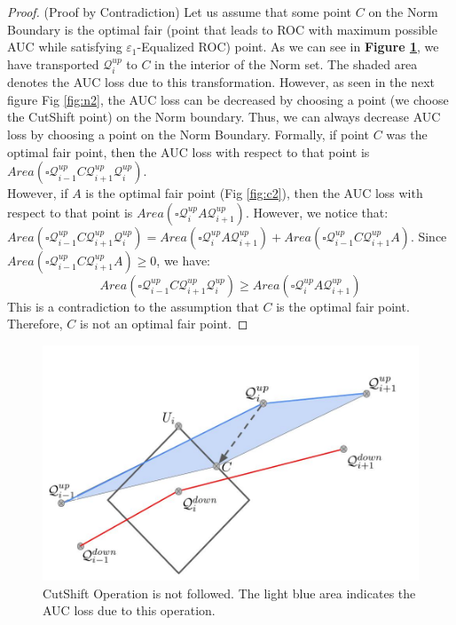 \documentclass{article}
\newcommand{\ourdef}{-Equalized ROC}
\begin{document}
\begin{proof}
(Proof by Contradiction) 
Let us assume that some point $C$ on the Norm Boundary is the optimal fair (point that leads to ROC with maximum possible AUC while satisfying $\varepsilon_1$\ourdef) point. 
As we can see in \textbf{Figure \ref{fig:c1}}, we have transported $\mathcal{Q}_{i}^{up}$ to $C$ in the interior of the Norm set. The shaded area denotes the AUC loss due to this transformation. However, as seen in the next figure Fig \ref{fig:n2}, the AUC loss can be decreased by choosing a point (we choose the CutShift point) on the Norm boundary. Thus, we can always decrease AUC loss by choosing a point on the Norm Boundary. Formally, if point $C$ was the optimal fair point, then the AUC loss with respect to that point is $Area(\square \mathcal{Q}^{up}_{i-1} C \mathcal{Q}^{up}_{i+1} \mathcal{Q}^{up}_{i})$. 
\\
However, if $A$ is the optimal fair point (Fig \ref{fig:c2}), then the AUC loss with respect to that point is $Area(\square \mathcal{Q}^{up}_{i} A \mathcal{Q}^{up}_{i+1})$. However, we notice that:$Area(\square \mathcal{Q}^{up}_{i-1} C \mathcal{Q}^{up}_{i+1} \mathcal{Q}^{up}_{i}) = Area(\square \mathcal{Q}^{up}_{i} A \mathcal{Q}^{up}_{i+1}) + Area(\square \mathcal{Q}^{up}_{i-1} C \mathcal{Q}^{up}_{i+1} A)$. Since $Area(\square \mathcal{Q}^{up}_{i-1} C \mathcal{Q}^{up}_{i+1} A) \ge 0$, we have:
    \[Area(\square \mathcal{Q}^{up}_{i-1} C \mathcal{Q}^{up}_{i+1} \mathcal{Q}^{up}_{i}) \ge Area(\square \mathcal{Q}^{up}_{i} A \mathcal{Q}^{up}_{i+1}) \]
This is a contradiction to the assumption that $C$ is the optimal fair point. Therefore, $C$ is not an optimal fair point.


\end{proof}

\begin{figure}[!h]
    \centering
    \includegraphics[scale =0.2]{diagrams/cut_proof0.jpg}
    \caption{CutShift Operation is not followed. The light blue area indicates the AUC loss due to this operation.}
    \label{fig:c1}
\end{figure}
\end{document}
